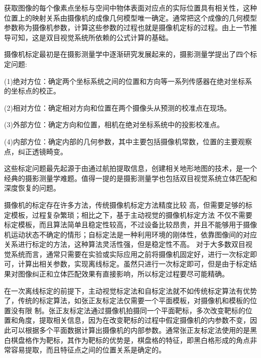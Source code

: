 获取图像的每个像素点坐标与空间中物体表面对应点的实际位置具有相关性，这种位置上的映射关系由摄像机的成像几何模型唯一确定。通常把这个成像的几何模型参数称为摄像机参数，计算这些参数的过程也就是摄像机定标的过程。由上一节推导可知，这是双目视觉系统所依赖的公式计算的基础。

摄像机标定最初是在摄影测量学中逐渐研究发展起来的，摄影测量学提出了四个标定问题:

(1)绝对方位：确定两个坐标系统之间的位置和方向等一系列传感器在绝对坐标系的坐标点的校正。

(2)相对方位：确定相对方向和位置在两个摄像头从预测的校准点在现场。

(3)外部方位：确定方向和位置，相机在绝对坐标系统中的投影校准点。

(4)内部方位：确定内部的几何参数，其中主要包括摄像机常数，位置的主要观察点，纠正透镜畸变。

这些标定问题最先起源于由通过航拍提取信息，创建相关地形地图的技术，是一个经典的摄影测量学难题。值得一提的是摄影测量学也包括双目视觉系统立体匹配和深度恢复的问题。

摄像机的标定存在许多方法，传统摄像机标定方法精度比较
高，但需要足够的标定模板，过程复杂繁琐；相比之下，基于主动视觉的摄像机标定方法
不仅不需要标定模板，而且算法简单且稳定性较高，不过设备比较昂贵，并且不能够用于摄像机运动状态不确定的情形；自标定法是一种利用环境的刚体性，依靠图像间的对应关系进行标定的方法，这种算法灵活性强，但是稳定性不高。 
对于大多数双目视觉系统而言，通常只需要在实验或实际应用之前将摄像机固定好，进行一次标定即可，计算出相关参数，实现离线标定。虽然只进行一次标定即可，但是由于标定结果对图像纠正和立体匹配效果有直接影响，所以标定过程要尽可能精确。

在一次离线标定的前提下，主动视觉标定法和自标定法就不如传统标定算法有优势了，传统的标定算法，如张正友标定法仅需要一个平面模板，对摄像机和模板的位置没有限
制。张正友标定法通过摄像机拍摄同一个平面靶标，多次改变靶标的位置和角度，提取相关信息，因为在改变靶标的过程中假定摄像机的内参数不变，因此可以根据多个平面数据计算出摄像机的内部参数。通常张正友标定法使用的是黑白棋盘格作为靶标，其作为靶标的优势是，棋盘格的特征，即黑白格形成的角点非常容易提取，而且特征点之间的位置关系是确定的。



